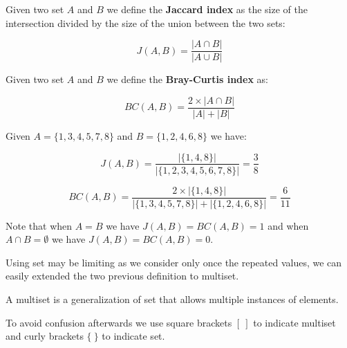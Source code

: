 \begin{definizione}\label{def:jaccard}
    Given two set $A$ and $B$ we define the \textbf{Jaccard index} as the size of the intersection divided by the size of the union between the two sets:
    
    \begin{equation}
    J(A,B) = \frac{|A \cap B|}{|A \cup B|}
    \end{equation}
    
\end{definizione}

\begin{definizione}\label{def:bray}
    Given two set $A$ and $B$ we define the \textbf{Bray-Curtis index} as:
    
    \begin{equation}
    BC(A,B) = \frac{2 \times |A \cap B|}{|A| + |B|}
    \end{equation}
    
\end{definizione}

\begin{esempio}
	Given $A = \{1, 3, 4, 5, 7, 8\}$ and $B = \{1, 2, 4, 6, 8\}$ we have:
	
	\begin{equation}
	J(A,B) = \frac{|\{1, 4, 8\}|}{|\{1, 2, 3, 4, 5, 6, 7, 8\}|} = \frac{3}{8} 
	\end{equation}
	
	\begin{equation}
	BC(A,B) = \frac{2 \times |\{1, 4, 8\}|}{|\{1, 3, 4, 5, 7, 8\}| + |\{1, 2, 4, 6, 8\}|} = \frac{6}{11} 
	\end{equation}
\end{esempio}

Note that when $A = B$ we have $J(A,B) = BC(A,B) = 1$ and when $A \cap B = \emptyset$ we have $J(A,B) = BC(A,B) = 0$.

\clearpage

Using set may be limiting as we consider only once the repeated values, we can easily extended the two previous definition to multiset.\\

\begin{definizione}
	A multiset is a generalization of set that allows multiple instances of elements.
\end{definizione}

To avoid confusion afterwards we use square brackets $[\ ]$ to indicate multiset and curly brackets $\{\ \}$ to indicate set.\\

